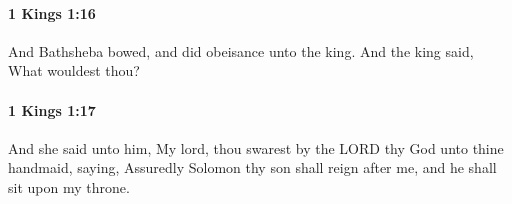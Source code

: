 		\paragraph{1 Kings 1:16} %
			\label{1KINGS-1-16}

			And Bathsheba bowed, and did obeisance unto the king. And the king said, What wouldest thou?


		\paragraph{1 Kings 1:17} %
			\label{1KINGS-1-17}

			And she said unto him, My lord, thou swarest by the LORD thy God unto thine handmaid, saying, Assuredly Solomon thy son shall reign after me, and he shall sit upon my throne.


